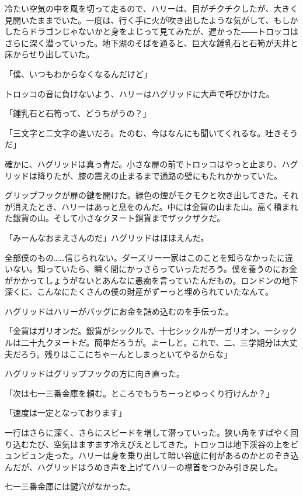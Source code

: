 \documentclass[10pt,a4paper]{article}
\begin{document}
\begin{CJK}{UTF8}{min}
冷たい空気の中を風を切って走るので、ハリーは、目がチクチクしたが、大きく見開いたままでいた。一度は、行く手に火が吹き出したような気がして、もしかしたらドラゴンじゃないかと身をよじって見てみたが、遅かった――トロッコはさらに深く潜っていった。地下湖のそばを通ると、巨大な鍾乳石と石筍が天井と床からせり出していた。

「僕、いつもわからなくなるんだけど」

トロッコの音に負けないよう、ハリーはハグリッドに大声で呼びかけた。

「鍾乳石と石筍って、どうちがうの？」

「三文字と二文字の違いだろ。たのむ、今はなんにも聞いてくれるな。吐きそうだ」

確かに、ハグリッドは真っ青だ。小さな扉の前でトロッコはやっと止まり、ハグリッドは降りたが、膝の震えの止まるまで通路の壁にもたれかかっていた。

グリップフックが扉の鍵を開けた。緑色の煙がモクモクと吹き出してきた。それが消えたとき、ハリーはあっと息をのんだ。中には金貨の山また山。高く積まれた銀貨の山。そして小さなクヌート銅貨までザックザクだ。

「みーんなおまえさんのだ」ハグリッドはほほえんだ。

全部僕のもの……信じられない。ダーズリー一家はこのことを知らなかったに違いない。知っていたら、瞬く間にかっさらっていっただろう。僕を養うのにお金がかかってしょうがないとあんなに愚痴を言っていたんだもの。ロンドンの地下深くに、こんなにたくさんの僕の財産がずーっと埋められていたなんて。

ハグリッドはハリーがバッグにお金を詰め込むのを手伝った。

「金貨はガリオンだ。銀貨がシックルで、十七シックルが一ガリオン、一シックルは二十九クヌートだ。簡単だろうが。よーしと。これで、二、三学期分は大丈夫だろう。残りはここにちゃーんとしまっといてやるからな」

ハグリッドはグリップフックの方に向き直った。

「次は七一三番金庫を頼む。ところでもうちーっとゆっくり行けんか？」

「速度は一定となっております」



一行はさらに深く、さらにスピードを増して潜っていった。狭い角をすばやく回り込むたび、空気はますます冷えびえとしてきた。トロッコは地下渓谷の上をビュンビュン走った。ハリーは身を乗り出して暗い谷底に何があるのかとのぞき込んだが、ハグリッドはうめき声を上げてハリーの襟首をつかみ引き戻した。

七一三番金庫には鍵穴がなかった。


\end{CJK}
\end{document}
